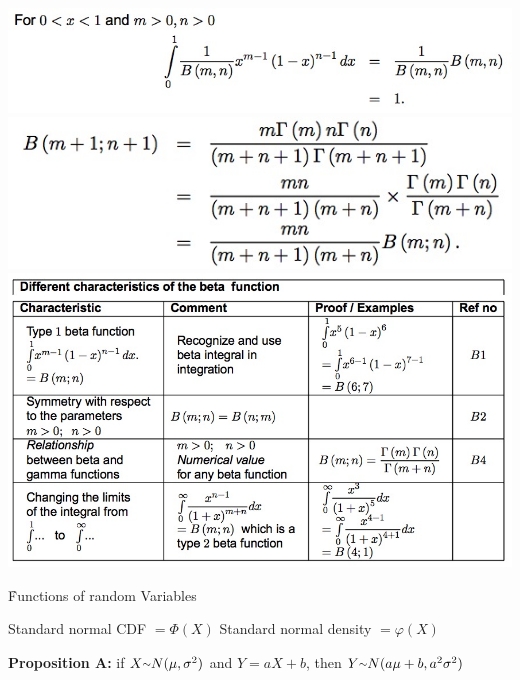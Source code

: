 \documentclass{/out/app/latex/examnotes}
\begin{document}
{\includegraphics[scale=0.4]{./img/2bet2.jpg}
\includegraphics[scale=0.4]{./img/2bet3.jpg}
\includegraphics[scale=0.5]{./img/2bet1.jpg}


\disobeylines

\obeylines

\h{Functions of random Variables}

Standard normal CDF $= \Phi(X)$ \quad Standard normal density $= \varphi(X)$

{\bf Proposition A:}
if $X\mytilde N(\mu,\sigma^2)$ and $Y=aX+b$, then $Y\mytilde N(a\mu+b,a^2\sigma^2)$

}
\end{document}
